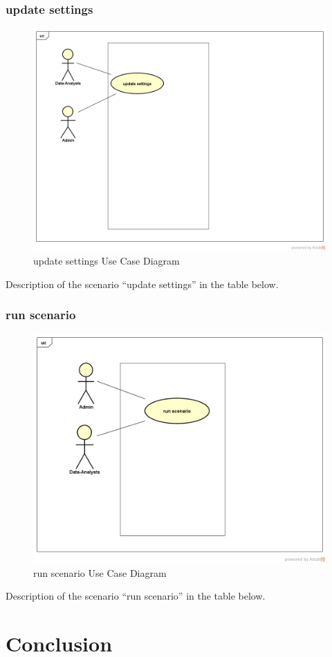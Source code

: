 \documentclass[12pt]{article}
\begin{document}
	 \subsubsection{update settings}
	 	\begin{figure}[h]
	 	\centering
	 	\includegraphics[width=1.0\textwidth]{updateSettings.png}
	 	\caption{update settings Use Case Diagram}
	 	
	 \end{figure}
  Description of the scenario ``update settings'' in the table below.
 \clearpage
 \newpage
	 \subsubsection{run scenario}
	 	\begin{figure}[h]
	 	\centering
	 	\includegraphics[width=1.0\textwidth]{runScenario.png}
	 	\caption{run scenario Use Case Diagram}
	 	
	 \end{figure}
	 Description of the scenario ``run scenario'' in the table below.
	
	\clearpage
	\newpage
	
	\section{Conclusion}
	
\end{document}
